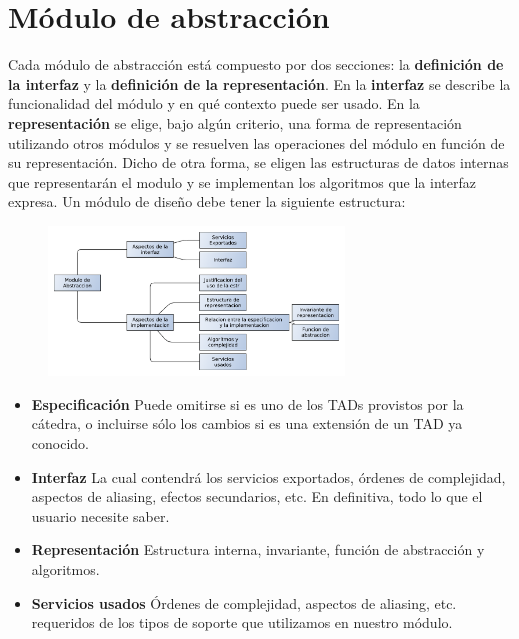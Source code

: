 \newpage

\section{M\'odulo de abstracci\'on}

Cada m\'odulo de abstracci\'on est\'a compuesto por dos secciones: la \textbf{definici\'on de la interfaz} y la \textbf{definici\'on de la representaci\'on}. En la \textbf{interfaz} se describe la funcionalidad del m\'odulo y en qu\'e contexto puede ser usado. En la \textbf{representaci\'on} se elige, bajo alg\'un criterio, una forma de representaci\'on utilizando otros m\'odulos y se resuelven las operaciones del m\'odulo en funci\'on de su representaci\'on. Dicho de otra forma, se eligen las estructuras de datos internas que representar\'an el modulo y se implementan los algoritmos que la interfaz expresa. Un m\'odulo de dise\~no debe tener la siguiente estructura:

\begin{figure}
 \centering
 \includegraphics[width=0.7\textwidth]{graficos/ModuloDeDisenio.pdf}
\end{figure}

\begin{itemize}
 \item \textbf{Especificaci\'on} Puede omitirse si es uno de los TADs provistos por la c\'atedra, o incluirse s\'olo los cambios si es una extensi\'on de un TAD ya conocido.
 \item \textbf{Interfaz} La cual contendr\'a los servicios exportados, \'ordenes de complejidad, aspectos de aliasing, efectos secundarios, etc. En definitiva, todo lo que el usuario necesite saber.
 \item \textbf{Representaci\'on} Estructura interna, invariante, funci\'on de abstracci\'on y algoritmos.
 \item \textbf{Servicios usados} \'Ordenes de complejidad, aspectos de aliasing, etc. requeridos de los tipos de soporte que utilizamos en nuestro m\'odulo.
\end{itemize}


